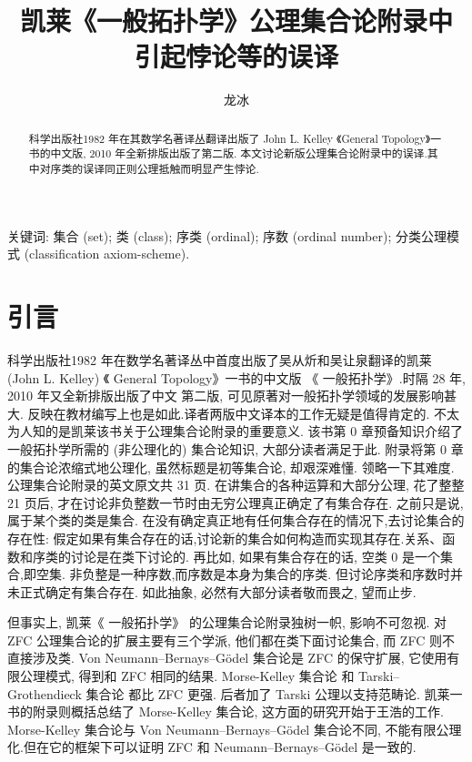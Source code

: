 \documentclass[zihao=-4,a4paper]{ctexart}
\title{凯莱《一般拓扑学》公理集合论附录中\\ 引起悖论等的误译}
\author{龙\quad 冰}
\date{}
\begin{document}
\maketitle
\begin{abstract}
科学出版社1982 年在其数学名著译丛翻译出版了 John L. Kelley 《General Topology》一书的中文版,  2010 年全新排版出版了第二版.
本文讨论新版公理集合论附录中的误译.其中对序类的误译同正则公理抵触而明显产生悖论.
\end{abstract}
	
关键词: 集合 (set); 类 (class); 序类 (ordinal); 
	序数 (ordinal number); 
	分类公理模式 (classification axiom-scheme).
	
	
	
\section{引言}
科学出版社1982 年在数学名著译丛中首度出版了吴从炘和吴让泉翻译的凯莱  (John L. Kelley) 《 General  Topology》\cite{jkelley1975}一书的中文版 《 一般拓扑学》.时隔 28 年, 2010 年又全新排版出版了中文 第二版\cite{jkelley2010zh}, 可见原著对一般拓扑学领域的发展影响甚大. 反映在教材编写上也是如此\cite{PuJiangHu1985}.译者两版中文译本的工作无疑是值得肯定的. 不太为人知的是凯莱该书关于公理集合论附录的重要意义. 该书第 0 章预备知识介绍了一般拓扑学所需的 (非公理化的) 集合论知识, 大部分读者满足于此. 
附录将第 0 章的集合论浓缩式地公理化, 虽然标题是初等集合论, 却艰深难懂. 领略一下其难度. 公理集合论附录的英文原文共 31 页. 在讲集合的各种运算和大部分公理, 花了整整 21 页后,
才在讨论非负整数一节时由无穷公理真正确定了有集合存在. 之前只是说, 属于某个类的类是集合. 在没有确定真正地有任何集合存在的情况下,去讨论集合的存在性: 假定如果有集合存在的话,讨论新的集合如何构造而实现其存在.关系、函数和序类的讨论是在类下讨论的. 再比如, 如果有集合存在的话, 空类 0 是一个集合,即空集.
非负整是一种序数,而序数是本身为集合的序类. 但讨论序类和序数时并未正式确定有集合存在.
如此抽象, 必然有大部分读者敬而畏之, 望而止步. 

但事实上, 凯莱《 一般拓扑学》 的公理集合论附录独树一帜, 影响不可忽视. 对 ZFC 公理集合论\cite{jjiang1991}\cite{enderton1977}的扩展主要有三个学派\cite{wikiSetTheory}, 他们都在类下面讨论集合, 而 ZFC 则不直接涉及类. Von Neumann–Bernays–Gödel 集合论\cite{wikiNBGSetTheory}是 ZFC 的保守扩展,  它使用有限公理模式, 得到和 ZFC 相同的结果. 
Morse-Kelley 集合论\cite{wikiMKSetTheory} 和 Tarski–Grothendieck 集合论\cite{wikiTGSetTheory} 都比 ZFC 更强. 后者加了 Tarski 公理以支持范畴论. 凯莱一书的附录则概括总结了 Morse-Kelley 集合论,
这方面的研究开始于王浩的工作\cite{wang1949}. Morse-Kelley 集合论与 Von Neumann–Bernays–Gödel  集合论不同, 不能有限公理化.但在它的框架下可以证明 ZFC 和 Neumann–Bernays–Gödel 是一致的.
\end{document}
